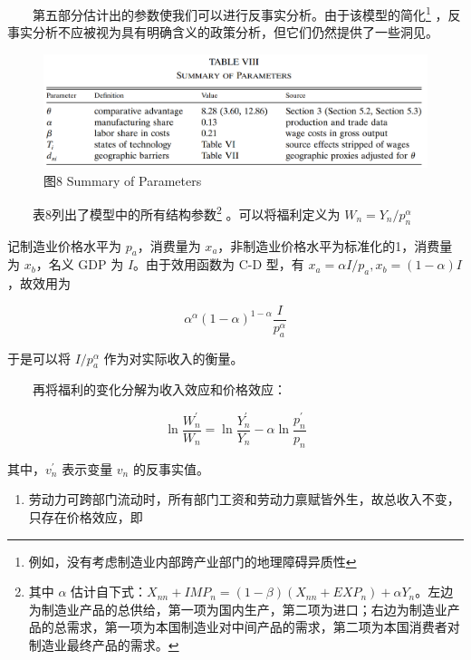 \documentclass[]{tufte-handout}
\providecommand{\tightlist}{%
  \setlength{\itemsep}{0pt}\setlength{\parskip}{0pt}}
\begin{document}
　　第五部分估计出的参数使我们可以进行反事实分析。由于该模型的简化\footnote{例如，没有考虑制造业内部跨产业部门的地理障碍异质性}
，反事实分析不应被视为具有明确含义的政策分析，但它们仍然提供了一些洞见。

\begin{figure}

{\centering \includegraphics[width=1\linewidth]{Figures/Table8} 

}

\caption[图8 Summary of Parameters]{图8 Summary of Parameters}\label{fig:t8}
\end{figure}

　　表8列出了模型中的所有结构参数\footnote{其中 \(\alpha\)
  估计自下式：\(X_{n n}+I M P_{n}=(1-\beta)\left(X_{n n}+E X P_{n}\right)+\alpha Y_{n}\)。左边为制造业产品的总供给，第一项为国内生产，第二项为进口；右边为制造业产品的总需求，第一项为本国制造业对中间产品的需求，第二项为本国消费者对制造业最终产品的需求。}
。可以将福利定义为 \(W_n = Y_n/{p_n^\alpha}\)

\begin{marginfigure}
记制造业价格水平为 \(p_a\)，消费量为
\(x_a\)，非制造业价格水平为标准化的1，消费量为 \(x_b\)，名义 GDP 为
\(I\)。由于效用函数为 C-D 型，有
\(x_a = \alpha I/p_a, x_b = (1-\alpha)I\)，故效用为

\[
\alpha^{\alpha}(1-\alpha)^{1-\alpha} \frac{I}{p_a^{\alpha}}
\]

于是可以将 \(I/{p_a^\alpha}\) 作为对实际收入的衡量。
\end{marginfigure}

　　再将福利的变化分解为收入效应和价格效应：

\[
\ln \frac{W_{n}^{\prime}}{W_{n}}=\ln \frac{Y_{n}^{\prime}}{Y_{n}}-\alpha \ln \frac{p_{n}^{\prime}}{p_{n}} 
\]

其中，\(v_n^{\prime}\) 表示变量 \(v_n\) 的反事实值。

\begin{enumerate}
\def\labelenumi{\arabic{enumi}.}
\tightlist
\item
  劳动力可跨部门流动时，所有部门工资和劳动力禀赋皆外生，故总收入不变，只存在价格效应，即
\end{enumerate}
\end{document}
